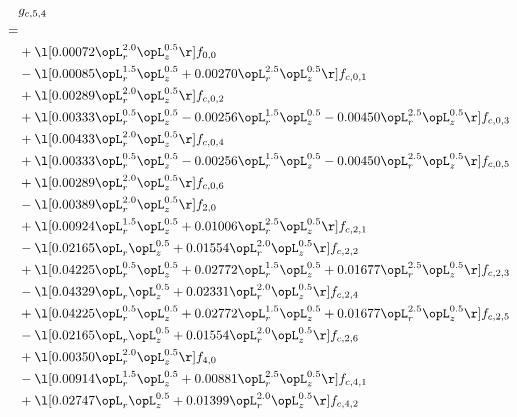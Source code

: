 \begin{alignat}{2} 
\label{eq:g_54_0} 
& g_{c,5,4} \nonumber \\ 
 = \\ 
& + \l[  0.00072 \opL_r^{2.0} \opL_z^{0.5}  \r] f_{0,0} \nonumber \\ 
& - \l[  0.00085 \opL_r^{1.5} \opL_z^{0.5} +  0.00270 \opL_r^{2.5} \opL_z^{0.5}  \r] f_{c,0,1} \nonumber \\ 
& + \l[  0.00289 \opL_r^{2.0} \opL_z^{0.5}  \r] f_{c,0,2} \nonumber \\ 
& + \l[  0.00333 \opL_r^{0.5} \opL_z^{0.5}   -0.00256 \opL_r^{1.5} \opL_z^{0.5}   -0.00450 \opL_r^{2.5} \opL_z^{0.5}  \r] f_{c,0,3} \nonumber \\ 
& + \l[  0.00433 \opL_r^{2.0} \opL_z^{0.5}  \r] f_{c,0,4} \nonumber \\ 
& + \l[  0.00333 \opL_r^{0.5} \opL_z^{0.5}   -0.00256 \opL_r^{1.5} \opL_z^{0.5}   -0.00450 \opL_r^{2.5} \opL_z^{0.5}  \r] f_{c,0,5} \nonumber \\ 
& + \l[  0.00289 \opL_r^{2.0} \opL_z^{0.5}  \r] f_{c,0,6} \nonumber \\ 
& - \l[  0.00389 \opL_r^{2.0} \opL_z^{0.5}  \r] f_{2,0} \nonumber \\ 
& + \l[  0.00924 \opL_r^{1.5} \opL_z^{0.5} +  0.01006 \opL_r^{2.5} \opL_z^{0.5}  \r] f_{c,2,1} \nonumber \\ 
& - \l[  0.02165 \opL_r \opL_z^{0.5} +  0.01554 \opL_r^{2.0} \opL_z^{0.5}  \r] f_{c,2,2} \nonumber \\ 
& + \l[  0.04225 \opL_r^{0.5} \opL_z^{0.5} +  0.02772 \opL_r^{1.5} \opL_z^{0.5} +  0.01677 \opL_r^{2.5} \opL_z^{0.5}  \r] f_{c,2,3} \nonumber \\ 
& - \l[  0.04329 \opL_r \opL_z^{0.5} +  0.02331 \opL_r^{2.0} \opL_z^{0.5}  \r] f_{c,2,4} \nonumber \\ 
& + \l[  0.04225 \opL_r^{0.5} \opL_z^{0.5} +  0.02772 \opL_r^{1.5} \opL_z^{0.5} +  0.01677 \opL_r^{2.5} \opL_z^{0.5}  \r] f_{c,2,5} \nonumber \\ 
& - \l[  0.02165 \opL_r \opL_z^{0.5} +  0.01554 \opL_r^{2.0} \opL_z^{0.5}  \r] f_{c,2,6} \nonumber \\ 
& + \l[  0.00350 \opL_r^{2.0} \opL_z^{0.5}  \r] f_{4,0} \nonumber \\ 
& - \l[  0.00914 \opL_r^{1.5} \opL_z^{0.5} +  0.00881 \opL_r^{2.5} \opL_z^{0.5}  \r] f_{c,4,1} \nonumber \\ 
& + \l[  0.02747 \opL_r \opL_z^{0.5} +  0.01399 \opL_r^{2.0} \opL_z^{0.5}  \r] f_{c,4,2} \nonumber \\ 

\end{alignat}
